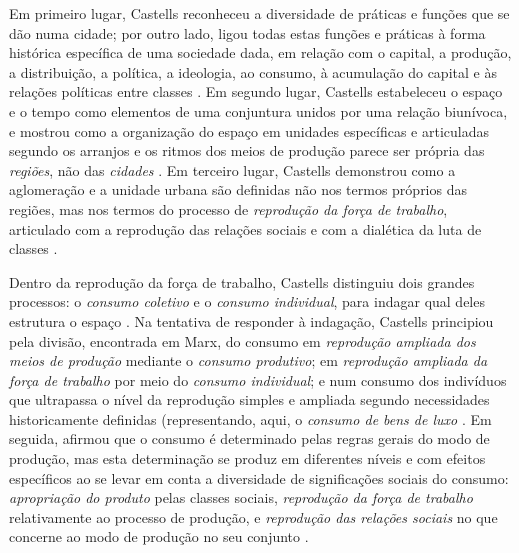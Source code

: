 Em primeiro lugar, Castells reconheceu a diversidade de práticas e funções que se dão numa cidade; por outro lado, ligou todas estas funções e práticas à forma histórica específica de uma sociedade dada, em relação com o capital, a produção, a distribuição, a política, a ideologia, ao consumo, à acumulação do capital e às relações políticas entre classes \cite[p.~550-551]{CASTELLS2000}. Em segundo lugar, Castells estabeleceu o espaço e o tempo como elementos de uma conjuntura unidos por uma relação biunívoca, e mostrou como a organização do espaço em unidades específicas e articuladas segundo os arranjos e os ritmos dos meios de produção parece ser própria das \textit{regiões}, não das \textit{cidades} \cite[p.~554-555]{CASTELLS2000}. Em terceiro lugar, Castells demonstrou como a aglomeração e a unidade urbana são definidas não nos termos próprios das regiões, mas nos termos do processo de \textit{reprodução da força de trabalho}, articulado com a reprodução das relações sociais e com a dialética da luta de classes \cite[p.~556-557]{CASTELLS2000}. 

Dentro da reprodução da força de trabalho, Castells distinguiu dois grandes processos: o \textit{consumo coletivo} e o \textit{consumo individual}, para indagar qual deles estrutura o espaço \cite[p.~557]{CASTELLS2000}. Na tentativa de responder à indagação, Castells principiou pela divisão, encontrada em Marx, do consumo em \textit{reprodução ampliada dos meios de produção} mediante o \textit{consumo produtivo}; em \textit{reprodução ampliada da força de trabalho} por meio do \textit{consumo individual}; e num consumo dos indivíduos que ultrapassa o nível da reprodução simples e ampliada segundo necessidades historicamente definidas (representando, aqui, o \textit{consumo de bens de luxo} \cite[p.~568]{CASTELLS2000}. Em seguida, afirmou que o consumo é determinado pelas regras gerais do modo de produção, mas esta determinação se produz em diferentes níveis e com efeitos específicos ao se levar em conta a diversidade de significações sociais do consumo: \textit{apropriação do produto} pelas classes sociais, \textit{reprodução da força de trabalho} relativamente ao processo de produção, e \textit{reprodução das relações sociais} no que concerne ao modo de produção no seu conjunto \cite[p.~569]{CASTELLS2000}. 

